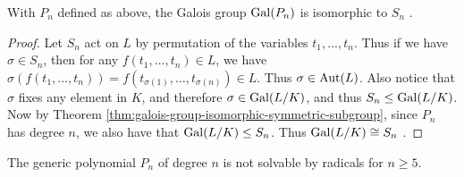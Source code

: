 %
%


\begin{lemma}\label{lemma:galois-symmetric}
	With $P_n$ defined as above, the Galois group $\operatorname{Gal}(P_n)$ is isomorphic to $S_n$ \cite{galois-lecture-polynomials} \cite{commutative-algebra-uon}.
\end{lemma}

\begin{proof}
	
	Let $S_n$ act on $L$ by permutation of the variables $t_1,...,t_n$. Thus if we have $\sigma \in S_n$, then for any $f(t_1,\dots,t_n) \in L $, we have 
	$   \sigma( f(t_1, \dots, t_n) )=f( t_{\sigma(1)},\dots,t_{\sigma(n)}) \in L. $
	Thus $\sigma \in \operatorname{Aut}(L)$.  Also notice that $\sigma$ fixes any element in $K$, and therefore
	 $\sigma \in \operatorname{Gal}(L/K)$, and thus $S_n \le \operatorname{Gal}(L/K)$.  Now by Theorem \ref{thm:galois-group-isomorphic-symmetric-subgroup}, since $P_n$ has degree $n$, we also have that $\operatorname{Gal}(L/K) \le S_n$. Thus $\operatorname{Gal}(L/K) \cong S_n$ . 
	
%	
	
\end{proof}


\begin{theorem}\label{thm:abel-ruffini-thm}
	The generic polynomial $P_n$ of degree $n$ is not solvable by radicals for $n \ge 5$. 
\end{theorem}

